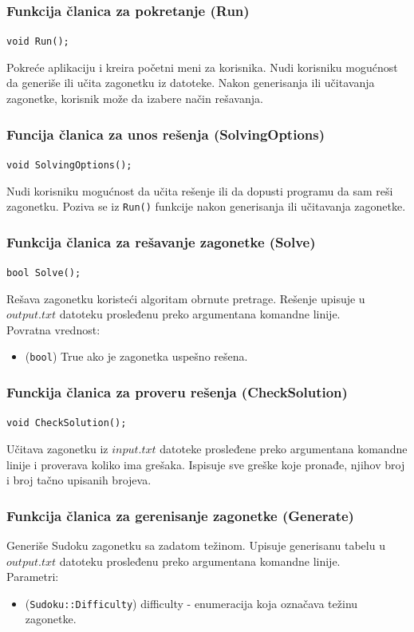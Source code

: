 \documentclass[a4paper]{article}
\begin{document}
    \subsubsection{Funkcija članica za pokretanje (Run)}
    \texttt{void Run();}
    \par Pokreće aplikaciju i kreira početni meni za korisnika. Nudi korisniku mogu\-ćnost da generiše 
    ili učita zagonetku iz datoteke. Nakon generisanja ili učitavanja zagonetke, korisnik može da izabere način rešavanja.

    \subsubsection{Funcija članica za unos rešenja (SolvingOptions)}
    \texttt{void SolvingOptions();}
    \par Nudi korisniku mogućnost da učita rešenje ili da dopusti programu da sam reši zagonetku. Poziva se  iz \texttt{Run()} funkcije nakon generisanja 
    ili učitavanja zagonetke.

    \subsubsection{Funkcija članica za rešavanje zagonetke (Solve)}
    \texttt{bool Solve();}
    \par Rešava zagonetku koristeći algoritam obrnute pretrage. Rešenje upisuje u $output.txt$ datoteku prosleđenu preko argumentana komandne linije.\\
    Povratna vrednost:
    \begin{itemize}
        \item (\texttt{bool}) True ako je zagonetka uspešno rešena.
    \end{itemize}

    \subsubsection{Funckija članica za proveru rešenja (CheckSolution)}
    \texttt{void CheckSolution();}
    \par Učitava zagonetku iz $input.txt$ datoteke prosleđene preko argumentana komandne linije i proverava koliko ima grešaka. Ispisuje sve greške koje pronađe, njihov broj i broj tačno upisanih brojeva.

    \subsubsection{Funkcija članica za gerenisanje zagonetke (Generate)}
    \par Generiše Sudoku zagonetku sa zadatom težinom. Upisuje generisanu tabelu u $output.txt$ datoteku prosleđenu preko argumentana komandne linije.\\
    Parametri:
    \begin{itemize}
        \item (\texttt{Sudoku::Difficulty}) difficulty - enumeracija koja označava težinu zagonetke.
    \end{itemize}
   
\end{document}
